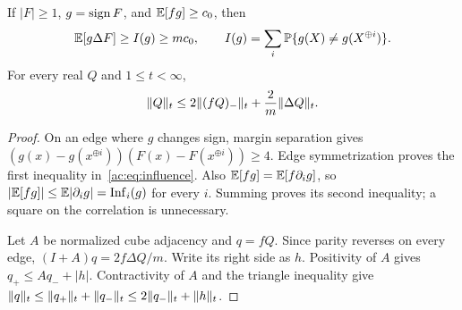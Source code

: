 \begin{lemma}\label{ac:lem:parity}
If $|F|\ge1$, $g=\operatorname{sign} F$, and $\mathbb E[fg]\ge c_0$, then
\begin{equation}\label{ac:eq:influence}
 \mathbb E[g\Delta F]\ge I(g)\ge mc_0,
 \qquad I(g)=\sum_i\mathbb P\{g(X)\ne g(X^{\oplus i})\}.
\end{equation}
For every real $Q$ and $1\le t<\infty$,
\begin{equation}\label{ac:eq:positive}
 \lVert Q\rVert_{t}\le 2\lVert (fQ)_-\rVert_{t}+\frac2m\lVert \Delta Q\rVert_{t}.
\end{equation}
\end{lemma}
\begin{proof}
On an edge where $g$ changes sign, margin separation gives
$(g(x)-g(x^{\oplus i}))(F(x)-F(x^{\oplus i}))\ge4$.
Edge symmetrization proves the first inequality in~\eqref{ac:eq:influence}.
Also $\mathbb E[fg]=\mathbb E[f\partial_i g]$, so
$|\mathbb E[fg]|\le\mathbb E|\partial_i g|=\operatorname{Inf}_i(g)$ for every $i$.
Summing proves its second inequality; a square on the correlation is unnecessary.

Let $A$ be normalized cube adjacency and $q=fQ$. Since parity reverses on every edge,
$(I+A)q=2f\Delta Q/m$. Write its right side as $h$. Positivity of $A$ gives
$q_+\le A q_-+|h|$. Contractivity of $A$ and the triangle inequality give
$\lVert q\rVert_{t}\le\lVert q_+\rVert_{t}+\lVert q_-\rVert_{t}\le2\lVert q_-\rVert_{t}+\lVert h\rVert_{t}$.
\end{proof}

